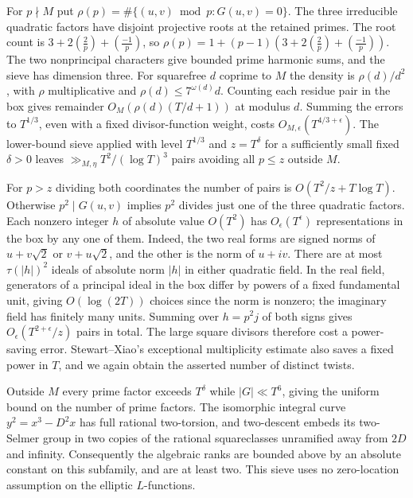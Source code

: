 \documentclass[11pt]{article}
\begin{document}
For $p\nmid M$ put $\rho(p)=\#\{(u,v)\bmod p:G(u,v)=0\}$. The three irreducible quadratic factors have disjoint projective roots at the retained primes. The root count is $3+2(\frac{2}{p})+(\frac{-1}{p})$, so $\rho(p)=1+(p-1)(3+2(\frac{2}{p})+(\frac{-1}{p}))$. The two nonprincipal characters give bounded prime harmonic sums, and the sieve has dimension three. For squarefree $d$ coprime to $M$ the density is $\rho(d)/d^2$, with $\rho$ multiplicative and $\rho(d)\le 7^{\omega(d)}d$. Counting each residue pair in the box gives remainder $O_M(\rho(d)(T/d+1))$ at modulus $d$. Summing the errors to $T^{1/3}$, even with a fixed divisor-function weight, costs $O_{M,\epsilon}(T^{4/3+\epsilon})$. The lower-bound sieve \cite[Chs.~4,9]{DHR} applied with level $T^{1/3}$ and $z=T^\delta$ for a sufficiently small fixed $\delta>0$ leaves $\gg_{M,\eta}T^2/(\log T)^3$ pairs avoiding all $p\le z$ outside $M$.

For $p>z$ dividing both coordinates the number of pairs is $O(T^2/z+T\log T)$. Otherwise $p^2\mid G(u,v)$ implies $p^2$ divides just one of the three quadratic factors. Each nonzero integer $h$ of absolute value $O(T^2)$ has $O_\epsilon(T^\epsilon)$ representations in the box by any one of them. Indeed, the two real forms are signed norms of $u+v\sqrt2$ or $v+u\sqrt2$, and the other is the norm of $u+iv$. There are at most $\tau(|h|)^2$ ideals of absolute norm $|h|$ in either quadratic field. In the real field, generators of a principal ideal in the box differ by powers of a fixed fundamental unit, giving $O(\log(2T))$ choices since the norm is nonzero; the imaginary field has finitely many units. Summing over $h=p^2j$ of both signs gives $O_\epsilon(T^{2+\epsilon}/z)$ pairs in total. The large square divisors therefore cost a power-saving error. Stewart--Xiao's exceptional multiplicity estimate also saves a fixed power in $T$, and we again obtain the asserted number of distinct twists.

Outside $M$ every prime factor exceeds $T^\delta$ while $|G|\ll T^6$, giving the uniform bound on the number of prime factors. The isomorphic integral curve $y^2=x^3-D^2x$ has full rational two-torsion, and two-descent embeds its two-Selmer group in two copies of the rational squareclasses unramified away from $2D$ and infinity. Consequently the algebraic ranks are bounded above by an absolute constant on this subfamily, and are at least two. This sieve uses no zero-location assumption on the elliptic $L$-functions.
\end{document}
